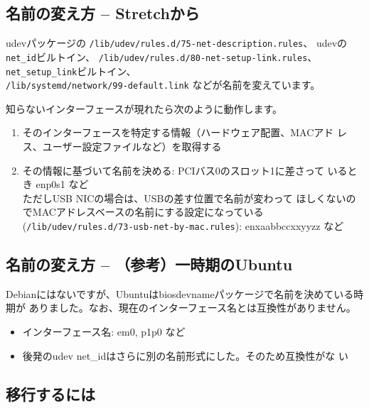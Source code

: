 \documentclass[mingoth,a4paper]{jsarticle}
\begin{document}
\subsection{名前の変え方 -- Stretchから}
 udevパッケージの
 \texttt{/lib/udev/rules.d/75-net-description.rules}、
 udevの\texttt{net\_id}ビルトイン、
 \texttt{/lib/udev/rules.d/80-net-setup-link.rules}、
 \texttt{net\_setup\_link}ビルトイン、\\
 \texttt{/lib/systemd/network/99-default.link} などが名前を変えています。

 知らないインターフェースが現れたら次のように動作します。
 \begin{enumerate}
  \item そのインターフェースを特定する情報（ハードウェア配置、MACアド
	レス、ユーザー設定ファイルなど）を取得する
  \item その情報に基づいて名前を決める: PCIバス0のスロット1に差さって
	いるとき enp0s1 など\\
	ただしUSB NICの場合は、USBの差す位置で名前が変わって
	ほしくないのでMACアドレスベースの名前にする設定になっている(\texttt{/lib/udev/rules.d/73-usb-net-by-mac.rules}): enxaabbccxxyyzz など
 \end{enumerate}


\subsection{名前の変え方 -- （参考）一時期のUbuntu}
 Debianにはないですが、Ubuntuはbiosdevnameパッケージで名前を決めている時期が
 ありました。なお、現在のインターフェース名とは互換性がありません。

 \begin{itemize}
  \item インターフェース名: em0, p1p0 など
  \item 後発のudev net\_idはさらに別の名前形式にした。そのため互換性がな
	い
 \end{itemize}


\subsection[containsverbatim]{移行するには}
\end{document}
